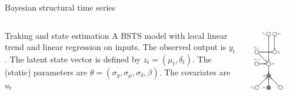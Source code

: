 \documentclass[11pt]{beamer}
\begin{document}
\begin{frame}{Bayesian structural time series \cite{pml2Book}}
\small
\begin{columns}
\begin{column}{0.5\textwidth}
\begin{alertblock}{Traking and state estimation}
A BSTS model with local linear trend and linear regression on inputs. The observed output
is $y_{t}$. The latent state vector is defined by $z_{t} = (\mu_{t}, \delta_{t})$. The (static) parameters are $\theta = (\sigma_{y}, \sigma_{\mu}, \sigma_{\delta}, \beta)$. The
covariates are $u_{t}$
\end{alertblock}
\end{column}
\begin{column}{0.5\textwidth}  %
    \begin{center}
     \includegraphics[width=0.7\textwidth]{Pic/BSTS.png}
     \end{center}
\end{column}
\end{columns}
\end{frame}
\end{document}

